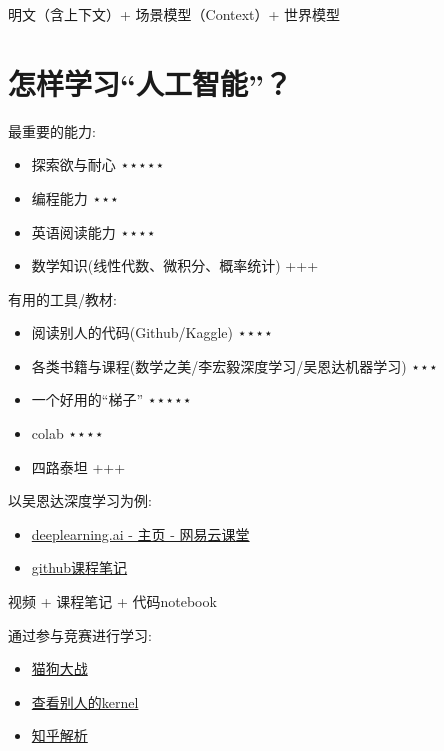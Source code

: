 \documentclass[11pt]{article}
\providecommand{\tightlist}{%
      \setlength{\itemsep}{0pt}\setlength{\parskip}{0pt}}
\begin{document}
明文（含上下文）+ 场景模型（Context）+ 世界模型

    \hypertarget{ux600eux6837ux5b66ux4e60ux4ebaux5de5ux667aux80fd}{%
\section{怎样学习``人工智能''？}\label{ux600eux6837ux5b66ux4e60ux4ebaux5de5ux667aux80fd}}

最重要的能力:

\begin{itemize}
\item
  探索欲与耐心 ⋆⋆⋆⋆⋆
\item
  编程能力 ⋆⋆⋆
\item
  英语阅读能力 ⋆⋆⋆⋆
\item
  数学知识(线性代数、微积分、概率统计) +++
\end{itemize}

    有用的工具/教材:

\begin{itemize}
\item
  阅读别人的代码(Github/Kaggle) ⋆⋆⋆⋆
\item
  各类书籍与课程(数学之美/李宏毅深度学习/吴恩达机器学习) ⋆⋆⋆
\item
  一个好用的``梯子'' ⋆⋆⋆⋆⋆
\item
  colab ⋆⋆⋆⋆
\item
  四路泰坦 +++
\end{itemize}

    以吴恩达深度学习为例:

\begin{itemize}
\tightlist
\item
  \href{https://study.163.com/provider/2001053000/index.htm}{deeplearning.ai
  - 主页 - 网易云课堂}
\item
  \href{https://github.com/bighuang624/Andrew-Ng-Deep-Learning-notes}{github课程笔记}
\end{itemize}

视频 + 课程笔记 + 代码notebook

    通过参与竞赛进行学习:

\begin{itemize}
\tightlist
\item
  \href{https://www.kaggle.com/c/dogs-vs-cats-redux-kernels-edition}{猫狗大战}
\item
  \href{https://www.kaggle.com/jeffd23/catdognet-keras-convnet-starter}{查看别人的kernel}
\item
  \href{https://zhuanlan.zhihu.com/p/51889181}{知乎解析}
\end{itemize}
\end{document}
